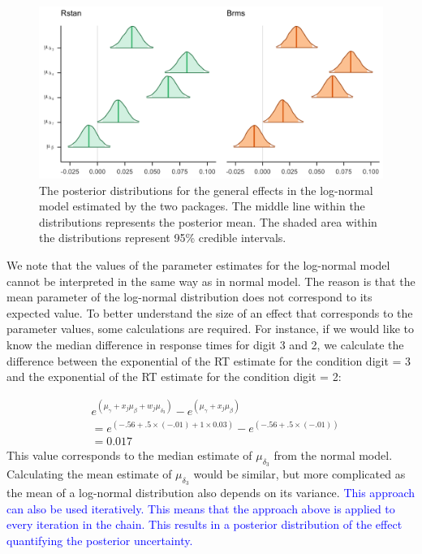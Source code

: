\documentclass[
  english,
  doc,floatsintext]{apa6}
\begin{document}
\begin{figure}[H]

\includegraphics[width=1\linewidth]{I - Images/Fig14_posteriormulog_v2} \hfill{}

\caption{The posterior distributions for the general effects in the log-normal model estimated by the two packages. The middle line within the distributions represents the posterior mean. The shaded area within the distributions represent 95\% credible intervals.}\label{fig:postplotlog}
\end{figure}

We note that the values of the parameter estimates for the log-normal model cannot be interpreted in the same way as in normal model. The reason is that the mean parameter of the log-normal distribution does not correspond to its expected value. To better understand the size of an effect that corresponds to the parameter values, some calculations are required. For instance, if we would like to know the median difference in response times for digit 3 and 2, we calculate the difference between the exponential of the RT estimate for the condition digit = 3 and the exponential of the RT estimate for the condition digit = 2:

\begin{equation}
\begin{aligned}
&e^{(\mu_{\gamma} + x_j \mu_{\beta} + w_j \mu_{\delta_{3}})} - e^{(\mu_{\gamma} +  x_j \mu_{\beta})} \\
&= e^{(-.56 + .5 \times (-.01) + 1 \times 0.03)} - e^{(-.56 + .5 \times (-.01))} \\ 
&= 0.017 
\end{aligned}
\end{equation}
This value corresponds to the median estimate of \(\mu_{\delta_{3}}\) from the normal model. Calculating the mean estimate of \(\mu_{\delta_{3}}\) would be similar, but more complicated as the mean of a log-normal distribution also depends on its variance. \textcolor{blue}{This approach can also be used iteratively. This means that the approach above is applied to every iteration in the chain. This results in a posterior distribution of the effect quantifying the posterior uncertainty.}
\end{document}

